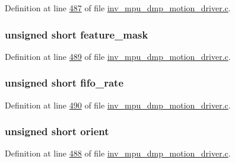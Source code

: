 Definition at line \hyperlink{inv__mpu__dmp__motion__driver_8c_source_l00487}{487} of file \hyperlink{inv__mpu__dmp__motion__driver_8c_source}{inv\+\_\+mpu\+\_\+dmp\+\_\+motion\+\_\+driver.\+c}.

\subsubsection[{\texorpdfstring{feature\+\_\+mask}{feature_mask}}]{\setlength{\rightskip}{0pt plus 5cm}unsigned short feature\+\_\+mask}\hypertarget{structdmp__s_ac1c048fa56b613b3223d2e66ac2c050f}{}\label{structdmp__s_ac1c048fa56b613b3223d2e66ac2c050f}


Definition at line \hyperlink{inv__mpu__dmp__motion__driver_8c_source_l00489}{489} of file \hyperlink{inv__mpu__dmp__motion__driver_8c_source}{inv\+\_\+mpu\+\_\+dmp\+\_\+motion\+\_\+driver.\+c}.

\subsubsection[{\texorpdfstring{fifo\+\_\+rate}{fifo_rate}}]{\setlength{\rightskip}{0pt plus 5cm}unsigned short fifo\+\_\+rate}\hypertarget{structdmp__s_a4aec83107ddc0d95ddf30cce1b7e6465}{}\label{structdmp__s_a4aec83107ddc0d95ddf30cce1b7e6465}


Definition at line \hyperlink{inv__mpu__dmp__motion__driver_8c_source_l00490}{490} of file \hyperlink{inv__mpu__dmp__motion__driver_8c_source}{inv\+\_\+mpu\+\_\+dmp\+\_\+motion\+\_\+driver.\+c}.

\subsubsection[{\texorpdfstring{orient}{orient}}]{\setlength{\rightskip}{0pt plus 5cm}unsigned short orient}\hypertarget{structdmp__s_ac949b11ebfe17c3a2ac42785a1437c25}{}\label{structdmp__s_ac949b11ebfe17c3a2ac42785a1437c25}


Definition at line \hyperlink{inv__mpu__dmp__motion__driver_8c_source_l00488}{488} of file \hyperlink{inv__mpu__dmp__motion__driver_8c_source}{inv\+\_\+mpu\+\_\+dmp\+\_\+motion\+\_\+driver.\+c}.

